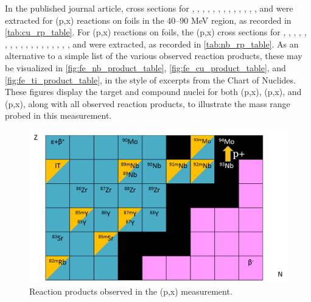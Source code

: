 In the published journal article, cross sections for  ,  , , , , , , ,  , , , , , and  were extracted for (p,x) reactions  on  foils in the 40--90 MeV region, as recorded in \autoref{tab:cu_rp_table}.
For  (p,x) reactions on  foils, the (p,x) cross sections for , , , , , , , , , , , , , , , , , , and  were extracted, as recorded in \autoref{tab:nb_rp_table}.
As an alternative to a simple list of the various observed reaction products, these may be visualized in \autoref{fig:fe_nb_product_table}, \autoref{fig:fe_cu_product_table}, and \autoref{fig:fe_ti_product_table}, in the style of excerpts from the Chart of  Nuclides.
These figures display the target and compound nuclei  for both  (p,x), (p,x), and (p,x), along with all observed reaction products, to illustrate the mass range probed in this measurement. 



\begin{figure}
 \centering
 \includegraphics[width=0.75\columnwidth]{./figures/ipf_nb_product_table.png}
 \caption{ Reaction products observed in the (p,x) measurement.}
 \label{fig:fe_nb_product_table}
\end{figure}


